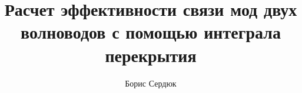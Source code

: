 \thispagestyle{empty}			

\title{Расчет эффективности связи мод двух волноводов с помощью интеграла перекрытия}
\author{Борис Сердюк}
\maketitle

\newpage
